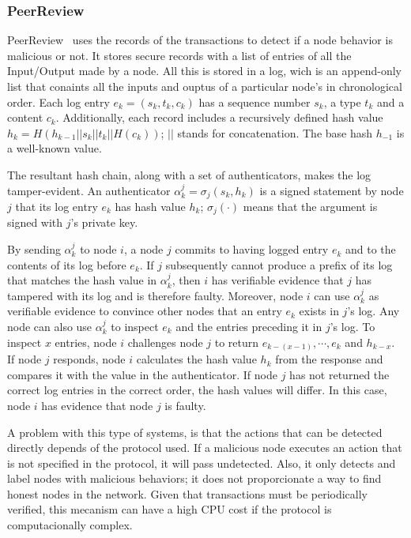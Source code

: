 \subsubsection{PeerReview}
\label{sec:peerreview}
PeerReview~\cite{haeberlen2007peerreview} uses the records of the transactions
to detect if a node behavior is malicious or not. It stores secure records with
a list of entries of all the Input/Output made by a node. All this is stored in
a log, wich is an append-only list that conaints all the inputs and ouptus of a
particular node's in chronological order. Each log entry $e_k = (s_k, t_k,
c_k)$ has a sequence number $s_k$, a type $t_k$ and a content $c_k$.
Additionally, each record includes a recursively defined hash value $h_k =
H(h_{k-1} || s_k|| t_k || H(c_k))$; $||$ stands for concatenation. The base
hash $h_{-1}$ is a well-known value.


The resultant hash chain, along with a set of authenticators, makes the log tamper-evident. An authenticator
$\alpha^j_k= \sigma_j(s_k , h_k )$ is a signed statement by node $j$ that its log
entry $e_k$ has hash value $h_k$; $\sigma_j (\cdot)$ means that the argument is
signed with $j$'s private key.

By sending $\alpha^j_k$ to node $i$, a node $j$ commits to having
 logged entry $e_k$ and to the contents of its log before $e_k$. If $j$
 subsequently cannot produce a prefix of its log that matches
 the hash value in $\alpha^j_k$, then $i$ has verifiable evidence that $j$
has tampered with its log and is therefore faulty.
Moreover, node $i$ can use $\alpha^j_k$ as verifiable evidence to convince
 other nodes that an entry $e_k$ exists in $j$'s log. Any node
 can also use $\alpha^j_k$ to inspect $e_k$ and the entries preceding it
 in $j$'s log. To inspect $x$ entries, node $i$ challenges node $j$ to return
 $e_{k - (x-1)}, \cdots , e_k$ and $h_{k - x}$. If node $j$ responds, node $i$ calculates the
hash value $h_k$ from the response and compares it with the
 value in the authenticator. If node $j$ has not returned the correct
 log entries in the correct order, the hash values will differ. In
this case, node $i$ has evidence that node $j$ is faulty. 
 

A problem with this type of systems, is that the actions that can be detected
directly depends of the protocol used. If a malicious node executes an action
that is not specified in the protocol, it will pass undetected. Also, it only
detects and label nodes with malicious behaviors; it does not proporcionate a
way to find honest nodes in the network.
Given that transactions must be periodically verified, this mecanism can have a high
CPU cost if the protocol is computacionally complex.
 
